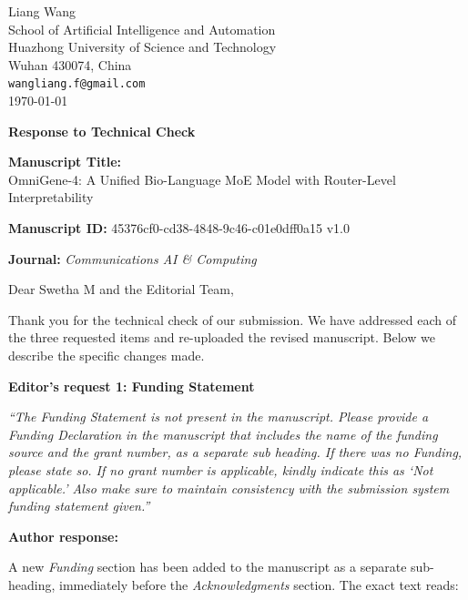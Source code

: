 \documentclass[11pt]{article}
\begin{document}
\begin{flushright}
\small
Liang Wang\\
School of Artificial Intelligence and Automation\\
Huazhong University of Science and Technology\\
Wuhan 430074, China\\
\texttt{wangliang.f@gmail.com}\\
\today
\end{flushright}

\vspace{0.5em}

\begin{center}
\Large\textbf{Response to Technical Check}
\end{center}

\vspace{0.5em}

\textbf{Manuscript Title:}\\
OmniGene-4: A Unified Bio-Language MoE Model with Router-Level Interpretability

\textbf{Manuscript ID:} 45376cf0-cd38-4848-9c46-c01e0dff0a15 v1.0

\textbf{Journal:} \textit{Communications AI \& Computing}

\vspace{1em}

Dear Swetha M and the Editorial Team,

Thank you for the technical check of our submission. We have addressed each of the three requested items and re-uploaded the revised manuscript. Below we describe the specific changes made.

\vspace{1em}

\textbf{\color{editorblue}Editor's request 1: Funding Statement}

\textit{``The Funding Statement is not present in the manuscript. Please provide a Funding Declaration in the manuscript that includes the name of the funding source and the grant number, as a separate sub heading. If there was no Funding, please state so. If no grant number is applicable, kindly indicate this as `Not applicable.' Also make sure to maintain consistency with the submission system funding statement given.''}

\textbf{\color{authorgreen}Author response:}

A new \emph{Funding} section has been added to the manuscript as a separate sub-heading, immediately before the \emph{Acknowledgments} section. The exact text reads:
\end{document}
